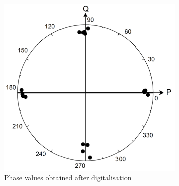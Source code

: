 {\begin{figure}
    \includegraphics[width=0.8\textwidth]{images/06.png}
    \caption{Phase values obtained after digitalisation}
    \label{fig:phase meas ijnect syn}
\end{figure}

}
